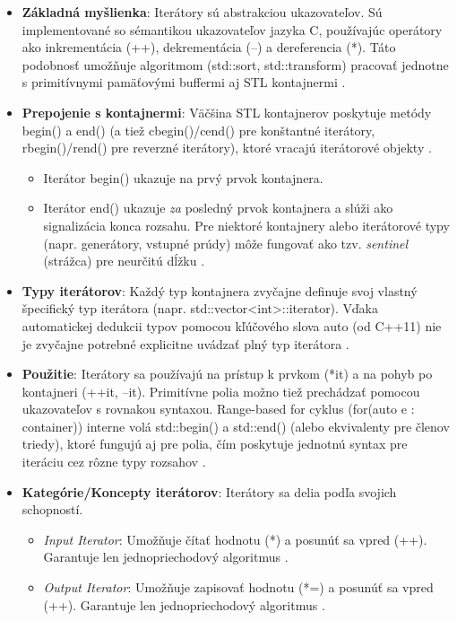 \documentclass[11pt]{article}
\begin{document}
\begin{itemize}
  \item \textbf{Základná myšlienka}: Iterátory sú abstrakciou ukazovateľov. Sú implementované so sémantikou ukazovateľov jazyka C, používajúc operátory ako inkrementácia (++), dekrementácia (--) a dereferencia (*). Táto podobnosť umožňuje algoritmom (std::sort, std::transform) pracovať jednotne s primitívnymi pamäťovými buffermi aj STL kontajnermi \cite{10162792}.
  \item \textbf{Prepojenie s kontajnermi}: Väčšina STL kontajnerov poskytuje metódy begin() a end() (a tiež cbegin()/cend() pre konštantné iterátory, rbegin()/rend() pre reverzné iterátory), ktoré vracajú iterátorové objekty \cite{10162792}.
  \begin{itemize}
    \item Iterátor begin() ukazuje na prvý prvok kontajnera.
    \item Iterátor end() ukazuje \textit{za} posledný prvok kontajnera a slúži ako signalizácia konca rozsahu. Pre niektoré kontajnery alebo iterátorové typy (napr. generátory, vstupné prúdy) môže fungovať ako tzv. \textit{sentinel} (strážca) pre neurčitú dĺžku \cite{10162792}.
  \end{itemize}
  \item \textbf{Typy iterátorov}: Každý typ kontajnera zvyčajne definuje svoj vlastný špecifický typ iterátora (napr. std::vector<int>::iterator). Vďaka automatickej dedukcii typov pomocou kľúčového slova auto (od C++11) nie je zvyčajne potrebné explicitne uvádzať plný typ iterátora \cite{10162792}.
  \item \textbf{Použitie}: Iterátory sa používajú na prístup k prvkom (*it) a na pohyb po kontajneri (++it, --it). Primitívne polia možno tiež prechádzať pomocou ukazovateľov s rovnakou syntaxou. Range-based for cyklus (for(auto e : container)) interne volá std::begin() a std::end() (alebo ekvivalenty pre členov triedy), ktoré fungujú aj pre polia, čím poskytuje jednotnú syntax pre iteráciu cez rôzne typy rozsahov \cite{10162792}.
  \item \textbf{Kategórie/Koncepty iterátorov}: Iterátory sa delia podľa svojich schopností.
  \begin{itemize}
    \item \textit{Input Iterator}: Umožňuje čítať hodnotu (*) a posunúť sa vpred (++). Garantuje len jednopriechodový algoritmus \cite{10162792}.
    \item \textit{Output Iterator}: Umožňuje zapisovať hodnotu (*=) a posunúť sa vpred (++). Garantuje len jednopriechodový algoritmus \cite{10162792}.

\end{itemize}
\end{itemize}
\end{document}
